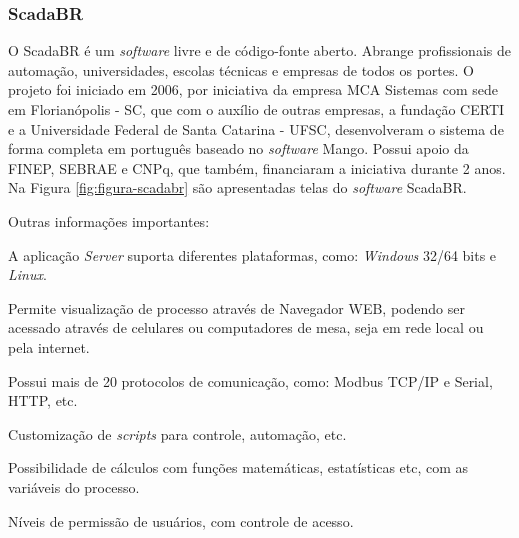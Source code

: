 \subsubsection{ScadaBR}
\label{sec:scadabr}

    O ScadaBR \cite{ScadaBR} é um \textit{software} livre e de código-fonte aberto. Abrange profissionais de automação, universidades, escolas técnicas e empresas de todos os portes. O projeto foi iniciado em 2006, por iniciativa da empresa MCA Sistemas com sede em Florianópolis - SC, que com o auxílio de outras empresas, a fundação CERTI e a Universidade Federal de Santa Catarina - UFSC, desenvolveram o sistema de forma completa em português baseado no \textit{software} Mango. Possui apoio da FINEP, SEBRAE e CNPq, que também, financiaram a iniciativa durante 2 anos. Na Figura \ref{fig:figura-scadabr} são apresentadas telas do \textit{software} ScadaBR.

    \begin{figure}[!h]
    \end{figure}
    
    Outras informações importantes:
    
    \begin{alineascomponto}
	    \item A aplicação \textit{Server} suporta diferentes plataformas, como: \textit{Windows} 32/64 bits e \textit{Linux}.
	    \item Permite visualização de processo através de Navegador \gls{WEB}, podendo ser acessado através de celulares ou computadores de mesa, seja em rede local ou pela internet.
    	\item Possui mais de 20 protocolos de comunicação, como: Modbus \gls{TCP/IP} e Serial, \gls{HTTP}, etc.
    	\item Customização de \textit{scripts} para controle, automação, etc.
    	\item Possibilidade de cálculos com funções matemáticas, estatísticas etc, com as variáveis do processo.
    	\item Níveis de permissão de usuários, com controle de acesso.
    \end{alineascomponto}
    
